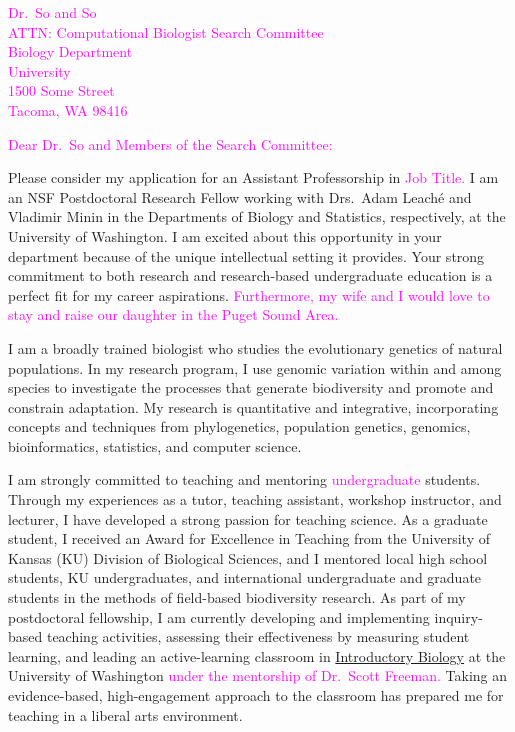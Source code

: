 \documentclass[letterpaper, 10pt]{letter}
\newcommand{\highlight}[1]{\textcolor{magenta}{#1}}
\begin{document}
\begin{letter}{
        \highlight{
        Dr.\ So  and So \\
        ATTN: Computational Biologist Search Committee \\
        Biology Department \\
        University \\
        1500 Some Street \\
        Tacoma, WA 98416
        }
    }
\opening{
    \highlight{
    Dear Dr.\ So and Members of the Search Committee:
    }
}
Please consider my application for an Assistant Professorship in
\highlight{
Job Title.
}
I am an NSF Postdoctoral Research Fellow working with Drs.\ Adam Leach\'{e} and
Vladimir Minin in the Departments of Biology and Statistics, respectively, at
the University of Washington.
I am excited about this opportunity in your department because of the unique
intellectual setting it provides.
Your strong commitment to both research and research-based undergraduate
education is a perfect fit for my career aspirations.
\highlight{
Furthermore, my wife and I would love to stay and raise our daughter in the
Puget Sound Area.
}

I am a broadly trained biologist who studies the evolutionary genetics of
natural populations.
In my research program, I use genomic variation within and among species to
investigate the processes that generate biodiversity and promote and constrain
adaptation.
My research is quantitative and integrative, incorporating concepts and
techniques from phylogenetics, population genetics, genomics, bioinformatics,
statistics, and computer science.

I am strongly committed to teaching and mentoring
\highlight{
    undergraduate
}
students.
Through my experiences as a tutor, teaching assistant, workshop instructor,
and lecturer, I have developed a strong passion for teaching science.
As a graduate student, I received an Award for Excellence in Teaching from the
University of Kansas (KU) Division of Biological Sciences, and I mentored local
high school students, KU undergraduates, and international undergraduate and
graduate students in the methods of field-based biodiversity research.
As part of my postdoctoral fellowship, I am currently developing and
implementing inquiry-based teaching activities, assessing their effectiveness
by measuring student learning, and leading an active-learning classroom in
\href{http://courses.biology.washington.edu/biol180/}{Introductory Biology} at
the University of Washington
\highlight{
    under the mentorship of Dr.\ Scott Freeman.
}
Taking an evidence-based, high-engagement approach to the classroom has
prepared me for teaching in a liberal arts environment.



\end{letter}
\end{document}
